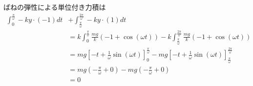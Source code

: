 \documentclass[a4paper,11pt]{jsarticle}
\begin{document}
\begin{enumerate}
  ばねの弾性による単位付き力積は
  \begin{align}
    \int_0^{\frac{\pi}{\omega}} -ky\cdot(-1) dt 
    &+ \int_{\frac{\pi}{\omega}}^{\frac{2\pi}{\omega}} -ky\cdot(1) dt
    \\ &= k \int_0^{\frac{\pi}{\omega}} \frac{mg}{k}\left(-1+\cos(\omega t)\right)
    - k \int_{\frac{\pi}{\omega}}^{\frac{2\pi}{\omega}} \frac{mg}{k}\left(-1+\cos(\omega t)\right)
    \\&= mg \left[-t+\frac{1}{\omega}\sin(\omega t)\right]_0^{\frac{\pi}{\omega}}
    - mg \left[-t+\frac{1}{\omega}\sin(\omega t)\right]_{\frac{\pi}{\omega}}^{\frac{2\pi}{\omega}}
    \\&= mg \left( -\frac{\pi}{\omega} + 0 \right)
    - mg\left( -\frac{\pi}{\omega} + 0 \right)
    \\ &= 0
  \end{align}

\end{enumerate}
\end{document}
